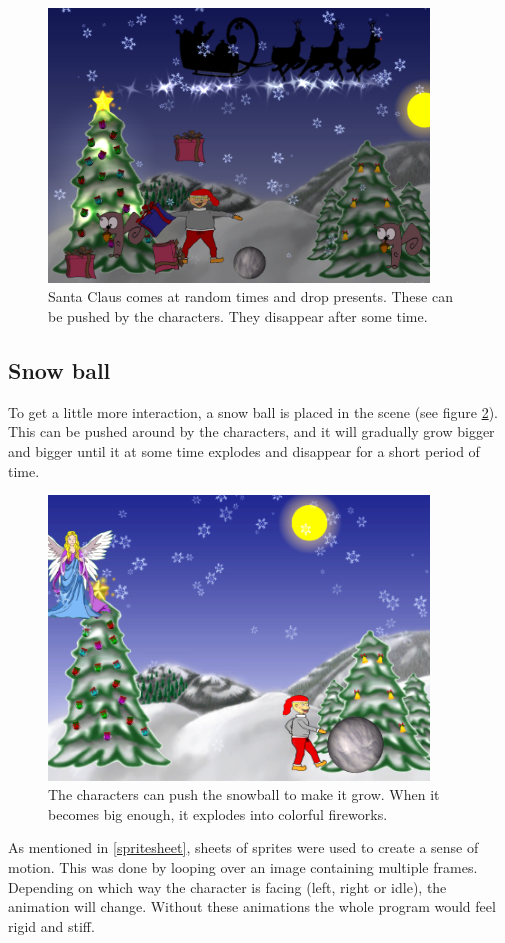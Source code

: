 \begin{figure}[htbp]
\centering
\includegraphics[width=0.90\textwidth]{Pictures/Design/santa.png}
\caption{Santa Claus comes at random times and drop presents. These can be pushed by the characters. They disappear after some time.}
\label{fig:santa}
\end{figure}

\subsection{Snow ball}
To get a little more interaction, a snow ball is placed in the scene (see figure \ref{fig:snowball}). This can be pushed around by the characters, and it will gradually grow bigger and bigger until it at some time explodes and disappear for a short period of time.


\begin{figure}[htbp]
\centering
\includegraphics[width=0.90\textwidth]{Pictures/Design/pushing_snowball.png}
\caption{The characters can push the snowball to make it grow. When it becomes big enough, it explodes into colorful fireworks.}
\label{fig:snowball}
\end{figure}
As mentioned in \ref{spritesheet}, sheets of sprites were used to create a sense of motion. This was done by looping over an image containing multiple frames. Depending on which way the character is facing (left, right or idle), the animation will change. Without these animations the whole program would feel rigid and stiff.

